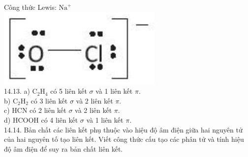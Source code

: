 \documentclass[10pt]{article}
\begin{document}
Công thức Lewis: $\mathrm{Na}^{+}$\\
\includegraphics[max width=\textwidth, center]{2025_10_23_ee735750217b2aca435cg-30}\\
14.13. a) $\mathrm{C}_{2} \mathrm{H}_{4}$ có 5 liên kết $\sigma$ và 1 liên kết $\pi$.\\
b) $\mathrm{C}_{2} \mathrm{H}_{2}$ có 3 liên kết $\sigma$ và 2 liên kết $\pi$.\\
c) HCN có 2 liên kết $\sigma$ và 2 liên kết $\pi$.\\
d) HCOOH có 4 liên kết $\sigma$ và 1 liên kết $\pi$.\\
14.14. Bản chất các liên kết phụ thuộc vào hiệu độ âm điện giữa hai nguyên tử của hai nguyên tố tạo liên kết. Viết công thức cấu tạo các phân tử và tính hiệu độ âm điện để suy ra bản chất liên kết.
\end{document}
